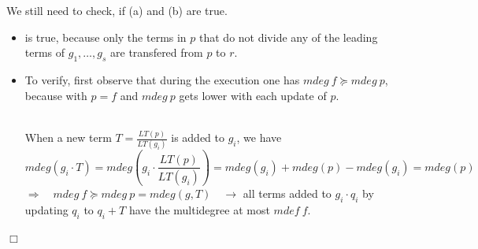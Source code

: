 \begin{theorem}[title = Theorem 2.2.2]
  We still need to check, if (a) and (b) are true. 

  \begin{itemize}
    \item[(a)] is true, because only the terms in $p$ that do not divide any of the leading terms of $g_1, \ldots, g_s$ are transfered from $p$ to $r$. 
    \item[(b)] To verify, first observe that during the execution one has $mdeg \ f \succeq mdeg \ p$, because with $p = f$ and $mdeg \ p$ gets lower with
    each update of $p$.  \\[0.3em]
    
    \begin{center}

    \end{center}  \ \\[0.3em]
    When a new term $T = \frac{LT(p)}{LT(g_i)}$ is added to $g_i$, we have \[mdeg(g_i \cdot T) = mdeg(g_i \cdot \frac{LT(p)}{LT(g_i)}) = mdeg(g_i) + mdeg(p) - mdeg(g_i) = mdeg(p)\]
    $\Longrightarrow \quad mdeg \ f \succeq mdeg \ p = mdeg(g, T) \quad \longrightarrow$ all terms added to $g_i \cdot q_i$ by updating $q_i$ to $q_i +T$ have the
    multidegree at most $mdef \ f$. 
  \end{itemize}
  \begin{flushright}
    $\Box $
  \end{flushright}
\end{theorem}

